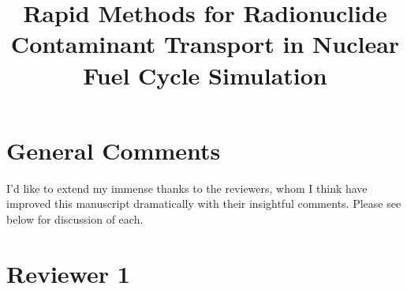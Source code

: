 \documentclass[answers,12pt]{exam}
\begin{document}



\title{Rapid Methods for Radionuclide Contaminant Transport in Nuclear Fuel 
        Cycle Simulation}



%

\section*{General Comments}
I'd like to extend my immense thanks to the reviewers, whom I think have
improved this manuscript dramatically with their insightful comments. Please
see below for discussion of each.  

\section*{Reviewer 1}
\end{document}
